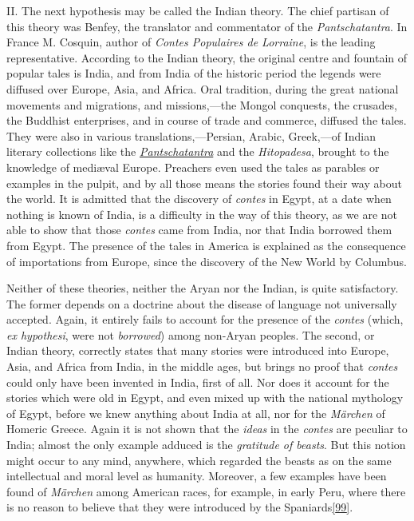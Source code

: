 \documentclass[14pt,a4paper]{memoir}
\newcommand{\ul}[1]{\uline{#1}}
\begin{document}
II. The next hypothesis may be called the Indian theory. The chief
partisan of this theory was Benfey, the translator and commentator of
the \emph{Pantschatantra}. In France M. Cosquin, author of \emph{Contes
Populaires de Lorraine}, is the leading representative. According to the
Indian theory, the original centre and fountain of popular tales is
India, and from India of the historic period the legends were diffused
over Europe, Asia, and Africa. Oral tradition, during the great national
movements and migrations, and missions,---the Mongol conquests, the
crusades, the Buddhist enterprises, and in course of trade and commerce,
diffused the tales. They were also in various translations,---Persian,
Arabic, Greek,---of Indian literary collections like the
\ul{\emph{Pantschatantra}} and the \emph{Hitopadesa}, brought to the
knowledge of mediæval Europe. Preachers even used the tales as parables
or \textquotesingle examples\textquotesingle{} in the pulpit, and by all
those means the stories found their way about the world. It is admitted
that the discovery of \emph{contes} in Egypt, at a date when nothing is
known of India, is a difficulty in the way of this theory, as we are not
able to show that those \emph{contes} came from India, nor that India
borrowed them from Egypt. The presence of the tales in America is
explained as the consequence of importations from Europe, since the
discovery of the New World by Columbus.

Neither of these theories, neither the Aryan nor the Indian, is quite
satisfactory. The former depends on a doctrine about the
\textquotesingle disease of language\textquotesingle{} not universally
accepted. Again, it entirely fails to account for the presence of the
\emph{contes} (which, \emph{ex hypothesi}, were not \emph{borrowed})
among non-Aryan peoples. The second, or Indian theory, correctly states
that many stories were introduced into Europe, Asia, and Africa from
India, in the middle ages, but brings no proof that \emph{contes} could
only have been invented in India, first of all. Nor does it account for
the stories which were old in Egypt, and even mixed up with the national
mythology of Egypt, before we knew anything about India at all, nor for
the \emph{Märchen} of Homeric Greece. Again it is not shown that the
\emph{ideas} in the \emph{contes} are peculiar to India; almost the only
example adduced is the \emph{gratitude of beasts}. But this notion might
occur to any mind, anywhere, which regarded the beasts as on the same
intellectual and moral level as humanity. Moreover, a few examples have
been found of \emph{Märchen} among American races, for example, in early
Peru, where there is no reason to believe that they were introduced by
the
Spaniards\protect\hypertarget{4533318093929944247_33931-h-1.htm.xhtmlux5cux23FNanchor_99}{}{}\protect\hyperlink{4533318093929944247_33931-h-1.htm.xhtmlux5cux23Footnote_99}{{[}99{]}}.
\end{document}
